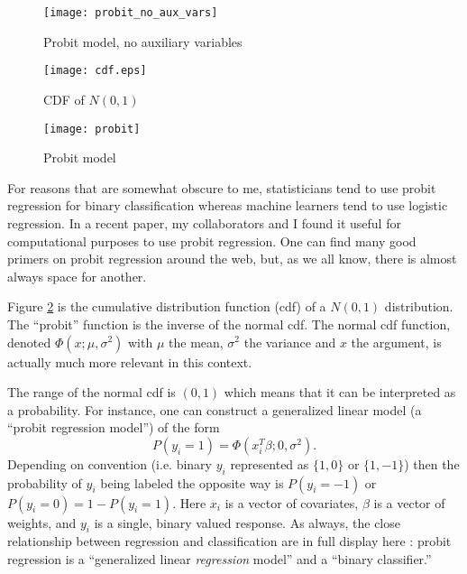 
\begin{figure}[htbp]
\begin{center}
\texttt{[image: probit\_no\_aux\_vars]}
\caption{Probit model, no auxiliary variables}
\label{fig:probit_no_aux_vars}
\end{center}
\end{figure}


\begin{figure}[htbp]
\begin{center}
\texttt{[image: cdf.eps]}
\caption{CDF of $N(0,1)$}
\label{fig:cdf}
\end{center}
\end{figure}

\begin{figure}[htbp]
\begin{center}
\texttt{[image: probit]}
\caption{Probit model}
\label{fig:probit}
\end{center}
\end{figure}




For reasons that are somewhat obscure to me, statisticians tend to use probit regression for binary classification whereas machine learners tend to use logistic regression.  In a recent paper, my collaborators and I found it useful for computational purposes to use probit regression.  One can find many good primers on probit regression around the web, but, as we all know, there is almost always space for another.  

Figure \ref{fig:cdf} is the cumulative distribution function (cdf) of a $N(0,1)$ distribution.  The ``probit'' function is the inverse of the normal cdf.    The normal cdf function, denoted $\Phi(x;\mu,\sigma^2)$ with $\mu$ the mean, $\sigma^2$ the variance and $x$ the argument, is actually much more relevant in this context.

The range of the normal cdf is $(0,1)$ which means that it can be interpreted as a probability.  For instance, one can construct a generalized linear model (a ``probit regression model'') of the form 
\begin{equation}
P(y_i = 1) = \Phi(x_i^T\beta; 0, \sigma^2). \label{eqn:probit}
\end{equation}  Depending on convention (i.e. binary $y_i$ represented as $\{1,0\}$ or $\{1,-1\}$) then the probability of $y_i$ being labeled the opposite way is $P(y_i = -1)$ or $P(y_i = 0) = 1 - P(y_i=1).$  Here $x_i$ is a vector of covariates, $\beta$ is a vector of weights, and $y_i$ is a single, binary valued response.  As always, the close relationship between regression and classification are in full display here : probit regression is a ``generalized linear {\em regression} model'' and a ``binary classifier.''

